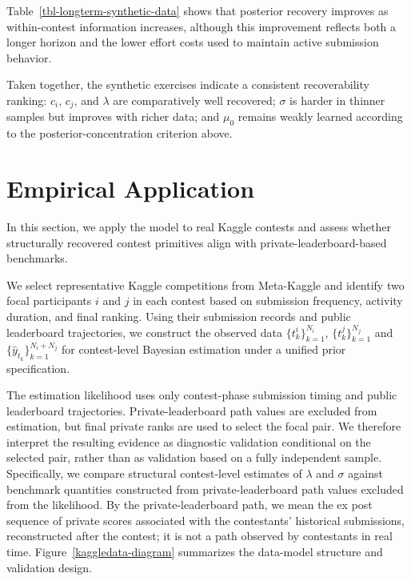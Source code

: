 \documentclass[mnsc]{informs3}
\begin{document}
Table~\ref{tbl-longterm-synthetic-data} shows that posterior recovery improves as within-contest information increases, although this improvement reflects both a longer horizon and the lower effort costs used to maintain active submission behavior.

Taken together, the synthetic exercises indicate a consistent recoverability ranking: $c_i$, $c_j$, and $\lambda$ are comparatively well recovered; $\sigma$ is harder in thinner samples but improves with richer data; and $\mu_0$ remains weakly learned according to the posterior-concentration criterion above.




\section{Empirical Application}
\label{sec-kaggle-application}

In this section, we apply the model to real Kaggle contests and assess whether structurally recovered contest primitives align with private-leaderboard-based benchmarks.

We select representative Kaggle competitions from Meta-Kaggle and identify two focal participants $i$ and $j$ in each contest based on submission frequency, activity duration, and final ranking.
Using their submission records and public leaderboard trajectories, we construct the observed data $\{t^i_k\}^{N_i}_{k=1}$, $\{t^j_k\}^{N_j}_{k=1}$ and $\{\hat{y}_{t_k}\}_{k=1}^{N_i+N_j}$ for contest-level Bayesian estimation under a unified prior specification.

The estimation likelihood uses only contest-phase submission timing and public leaderboard trajectories. 
Private-leaderboard path values are excluded from estimation, but final private ranks are used to select the focal pair. 
We therefore interpret the resulting evidence as diagnostic validation conditional on the selected pair, rather than as validation based on a fully independent sample.
Specifically, we compare structural contest-level estimates of $\lambda$ and $\sigma$ against benchmark quantities constructed from private-leaderboard path values excluded from the likelihood.
By the private-leaderboard path, we mean the ex post sequence of private scores associated with the contestants' historical submissions, reconstructed after the contest; it is not a path observed by contestants in real time.
Figure~\ref{kaggledata-diagram} summarizes the data-model structure and validation design.
\end{document}
